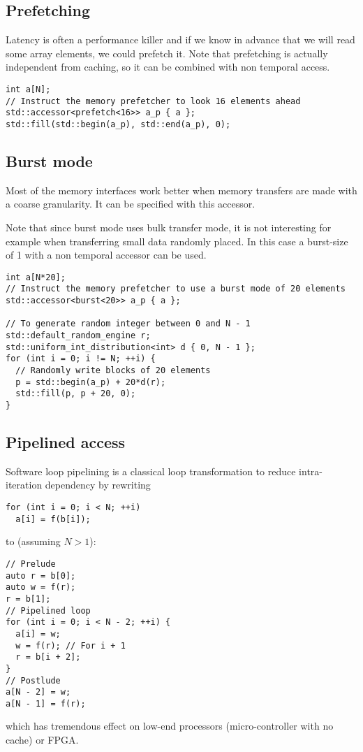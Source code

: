 \documentclass[a4paper]{article}
\begin{document}
\subsection{Prefetching}
\label{sec:prefetching}

Latency is often a performance killer and if we know in advance that
we will read some array elements, we could prefetch it. Note that
prefetching is actually independent from caching, so it can be
combined with non temporal access.

\begin{lstlisting}
int a[N];
// Instruct the memory prefetcher to look 16 elements ahead
std::accessor<prefetch<16>> a_p { a };
std::fill(std::begin(a_p), std::end(a_p), 0);
\end{lstlisting}


\subsection{Burst mode}
\label{sec:burst-mode}

Most of the memory interfaces work better when memory transfers are
made with a coarse granularity. It can be specified with this accessor.

Note that since burst mode uses bulk transfer mode, it is not
interesting for example when transferring small data randomly
placed. In this case a burst-size of 1 with a non temporal accessor
can be used.

\begin{lstlisting}
int a[N*20];
// Instruct the memory prefetcher to use a burst mode of 20 elements
std::accessor<burst<20>> a_p { a };

// To generate random integer between 0 and N - 1
std::default_random_engine r;
std::uniform_int_distribution<int> d { 0, N - 1 };
for (int i = 0; i != N; ++i) {
  // Randomly write blocks of 20 elements
  p = std::begin(a_p) + 20*d(r);
  std::fill(p, p + 20, 0);
}
\end{lstlisting}


\subsection{Pipelined access}
\label{sec:pipelined-access}

Software loop pipelining is a classical loop transformation to reduce
intra-iteration dependency by rewriting
\begin{lstlisting}
for (int i = 0; i < N; ++i)
  a[i] = f(b[i]);
\end{lstlisting}
to (assuming $N > 1$):
\begin{lstlisting}
// Prelude
auto r = b[0];
auto w = f(r);
r = b[1];
// Pipelined loop
for (int i = 0; i < N - 2; ++i) {
  a[i] = w;
  w = f(r); // For i + 1
  r = b[i + 2];
}
// Postlude
a[N - 2] = w;
a[N - 1] = f(r);
\end{lstlisting}
which has tremendous effect on low-end processors (micro-controller
with no cache) or FPGA.
\end{document}
